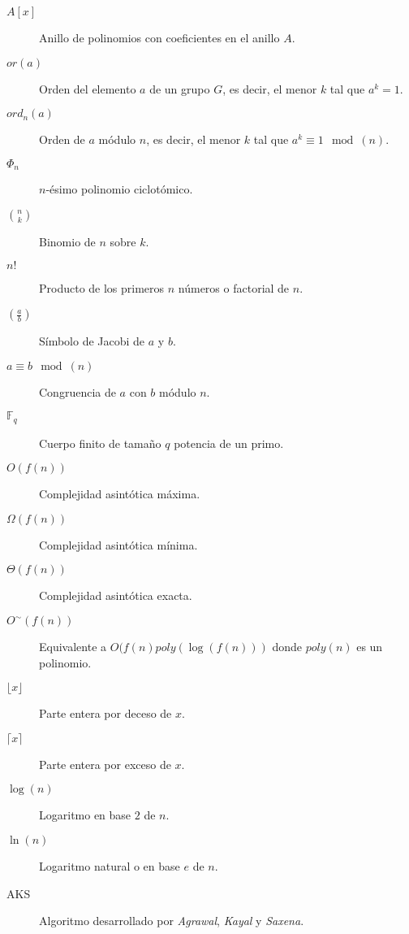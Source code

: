\begin{description}
	\item[${A[x]}$] Anillo de polinomios con coeficientes en el anillo $A$.
	
	\item[$or(a)$] Orden del elemento $a$ de un grupo $G$, es decir, el menor $k$ tal que $a^k = 1$.
	
	\item[$ord_n(a)$] Orden de $a$ módulo $n$, es decir, el menor $k$ tal que $a^k \equiv 1 \mod(n)$.
	
	\item[$\Phi_n$] $n$-ésimo polinomio ciclotómico.
	
	\item[$\binom{n}{k}$] Binomio de $n$ sobre $k$.
	
	\item[$n!$] Producto de los primeros $n$ números o factorial de $n$.
	
	\item[$\left(\frac{a}{b}\right)$] Símbolo de Jacobi de $a$ y $b$.
	
	\item[$a \equiv b \mod(n)$] Congruencia de $a$ con $b$ módulo $n$.
	
	\item[$\mathbb{F}_q$] Cuerpo finito de tamaño $q$ potencia de un primo.
	
	\item[$O(f(n))$] Complejidad asintótica máxima.
	
	\item[$\Omega(f(n))$] Complejidad asintótica mínima.
	
	\item[$\Theta(f(n))$] Complejidad asintótica exacta.
	
	\item[$O^\sim(f(n))$] Equivalente a $O(f(n)poly(\log(f(n)))$ donde $poly(n)$ es un polinomio.
	
	\item[$\lfloor x \rfloor$] Parte entera por deceso de $x$.
	
	\item[$\lceil x \rceil$] Parte entera por exceso de $x$.
	
	\item[$\log(n)$] Logaritmo en base $2$ de $n$.
	
	\item[$\ln(n)$] Logaritmo natural o en base $e$ de $n$.
	
	\item[AKS] Algoritmo desarrollado por \textit{Agrawal}, \textit{Kayal} y \textit{Saxena}.
	

\end{description}
